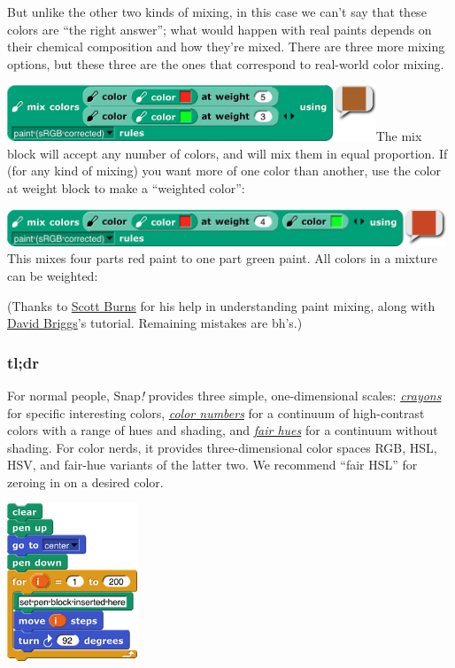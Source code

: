 But unlike the other two kinds of mixing, in this case we can't say that
these colors are ``the right answer''; what would happen with real
paints depends on their chemical composition and how they're mixed.
There are three more mixing options, but these three are the ones that
correspond to real-world color mixing.

\includegraphics[width=4.34028in,height=0.65278in]{media/image1231.png}The
mix block will accept any number of colors, and will mix them in equal
proportion. If (for any kind of mixing) you want more of one color than
another, use the color at weight block to make a ``weighted color'':

\includegraphics[width=5.16667in,height=0.43056in]{media/image1232.png}This
mixes four parts red paint to one part green paint. All colors in a
mixture can be weighted:

(Thanks to \href{http://scottburns.us/subtractive-color-mixture/}{Scott
Burns} for his help in understanding paint mixing, along with
\href{http://www.huevaluechroma.com/061.php}{David Briggs}'s tutorial.
Remaining mistakes are bh's.)

\subsubsection{tl;dr}\label{tldr}

For normal people, Snap\emph{!} provides three simple, one-dimensional
scales: \emph{\ul{crayons}} for specific interesting colors,
\emph{\ul{color numbers}} for a continuum of high-contrast colors with a
range of hues and shading, and \emph{\ul{fair hues}} for a continuum
without shading. For color nerds, it provides three-dimensional color
spaces RGB, HSL, HSV, and fair-hue variants of the latter two.
\label{spirals}{}We recommend ``fair HSL'' for zeroing in
on a desired color.

\includegraphics[width=1.53472in,height=1.84722in]{media/image1241.png}

